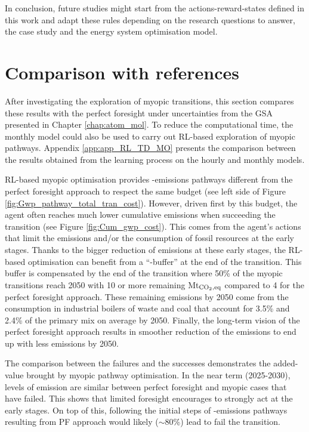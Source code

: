 In conclusion, future studies might start from the actions-reward-states defined in this work and adapt these rules depending on the research questions to answer, the case study and the energy system optimisation model.

\newpage
\section{Comparison with references}
\label{sec:RL:testing}
After investigating the exploration of myopic transitions, this section compares these results with the perfect foresight under uncertainties from the \gls{GSA} presented in Chapter \ref{chap:atom_mol}. To reduce the computational time, the monthly model could also be used to carry out \gls{RL}-based exploration of myopic pathways. Appendix \ref{app:app_RL_TD_MO} presents the comparison between the results obtained from the learning process on the hourly and monthly models.

\gls{RL}-based myopic optimisation provides -emissions pathways different from the perfect foresight approach to respect the same  budget (see left side of Figure \ref{fig:Gwp_pathway_total_tran_cost}). However, driven first by this  budget, the agent often reaches much lower cumulative emissions when succeeding the transition (see Figure \ref{fig:Cum_gwp_cost}). This comes from the agent's actions that limit the emissions and/or the consumption of fossil resources at the early stages. Thanks to the bigger reduction of emissions at these early stages, the \gls{RL}-based optimisation can benefit from a ``-buffer'' at the end of the transition. This buffer is compensated by the end of the transition where 50\% of the myopic transitions reach 2050 with 10 or more remaining Mt$_{\ce{CO2},\text{eq}}$ compared to 4 for the perfect foresight approach. These remaining emissions by 2050 come from the consumption in industrial boilers of waste and coal that account for 3.5\% and 2.4\% of the primary mix on average by 2050. Finally, the long-term vision of the perfect foresight approach results in smoother reduction of the emissions to end up with less emissions by 2050.

The comparison between the failures and the successes demonstrates the added-value brought by myopic pathway optimisation. In the near term (2025-2030), levels of emission are similar between perfect foresight and myopic cases that have failed. This shows that limited foresight encourages to strongly act at the early stages. On top of this, following the initial steps of -emissions pathways resulting from PF approach would likely ($\sim$80\%) lead to fail the transition. 

